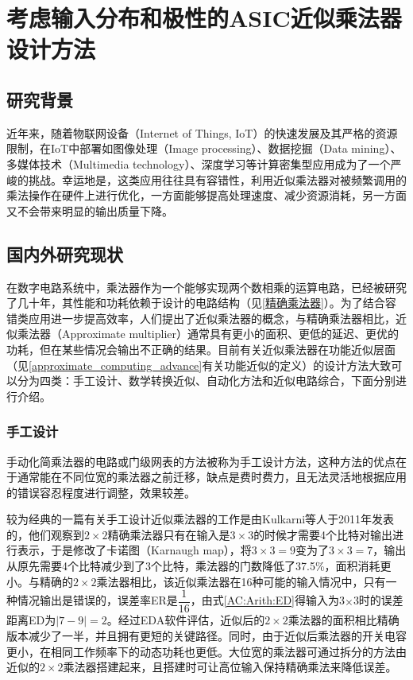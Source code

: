 \chapter{考虑输入分布和极性的ASIC近似乘法器设计方法}


\section{研究背景}

近年来，随着物联网设备（Internet of Things, IoT）的快速发展及其严格的资源限制，在IoT中部署如图像处理（Image processing）、数据挖掘（Data mining）、多媒体技术（Multimedia technology）、深度学习等计算密集型应用成为了一个严峻的挑战\cite{AC:AM:survey_zhuocheng}。幸运地是，这类应用往往具有容错性，利用近似乘法器对被频繁调用的乘法操作在硬件上进行优化，一方面能够提高处理速度、减少资源消耗，另一方面又不会带来明显的输出质量下降。

\section{国内外研究现状}

在数字电路系统中，乘法器作为一个能够实现两个数相乘的运算电路，已经被研究了几十年，其性能和功耗依赖于设计的电路结构（见\ref{精确乘法器}）。为了结合容错类应用进一步提高效率，人们提出了近似乘法器的概念，与精确乘法器相比，近似乘法器（Approximate multiplier）通常具有更小的面积、更低的延迟、更优的功耗，但在某些情况会输出不正确的结果。目前有关近似乘法器在功能近似层面（见\ref{approximate_computing_advance}有关功能近似的定义）的设计方法大致可以分为四类：手工设计、数学转换近似、自动化方法和近似电路综合，下面分别进行介绍。

\subsection{手工设计}

手动化简乘法器的电路或门级网表的方法被称为手工设计方法，这种方法的优点在于通常能在不同位宽的乘法器之前迁移，缺点是费时费力，且无法灵活地根据应用的错误容忍程度进行调整，效果较差。

较为经典的一篇有关手工设计近似乘法器的工作是由Kulkarni等人\cite{AC:AM:KMap}于2011年发表的，他们观察到$2 \times 2$精确乘法器只有在输入是$3 \times 3$的时候才需要4个比特对输出进行表示，于是修改了卡诺图（Karnaugh map），将$3 \times 3 = 9$变为了$3 \times 3 = 7$，输出从原先需要4个比特减少到了3个比特，乘法器的门数降低了37.5\%，面积消耗更小。与精确的$2 \times 2$乘法器相比，该近似乘法器在16种可能的输入情况中，只有一种情况输出是错误的，误差率ER是$\dfrac{1}{16}$，由式\eqref{AC:Arith:ED}得输入为3$\times$3时的误差距离ED为$|7 − 9| = 2$。经过EDA软件评估，近似后的$2 \times 2$乘法器的面积相比精确版本减少了一半，并且拥有更短的关键路径。同时，由于近似后乘法器的开关电容更小，在相同工作频率下的动态功耗也更低。大位宽的乘法器可通过拆分的方法由近似的$2 \times 2$乘法器搭建起来，且搭建时可让高位输入保持精确乘法来降低误差。

